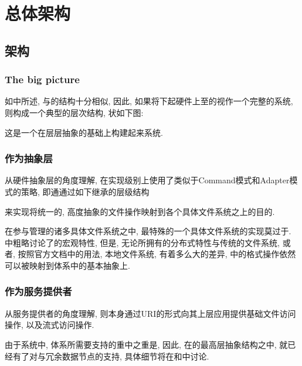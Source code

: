 \chapter{\HFS 总体架构}
\label{ch:hfs}

\section{\HFS 架构}
\label{sec:hfs:arch}

\subsection{The big picture}
\label{ssec:hfs:bigpic}

如中所述, {\HFS}与{\VFS}的结构十分相似,
因此, 如果将下起硬件上至{\HFS}的视作一个完整的系统, 则{\HFS}构成一个典型的层次结构,
状如下图:


这是一个在层层抽象的基础上构建起来系统.


\subsection{作为抽象层}
\label{ssec:hfs:al}

从硬件抽象层的角度理解{\HFS},
{\HFS}在实现级别上使用了类似于Command模式和Adapter模式的策略,
即通通过如下继承的层级结构


来实现将统一的, 高度抽象的文件操作映射到各个具体文件系统之上的目的.

在{\HFS}参与管理的诸多具体文件系统之中, 最特殊的一个具体文件系统的实现莫过于{\HDFS}.
中粗略讨论了{\HDFS}的宏观特性,
但是, 无论{\HDFS}所拥有的分布式特性与传统的文件系统, 或者, 按照官方文档中的用法, 本地文件系统,
有着多么大的差异, {\DHFS}中的格式操作依然可以被映射到{\HFS}体系中的基本抽象上.


\subsection{作为服务提供者}
\label{ssec:hfs:srv}

从服务提供者的角度理解{\HFS}, 则{\HFS}本身通过URI的形式向其上层应用提供基础文件访问操作,
以及流式访问操作.

由于{\Hadoop}系统中, {\HFS}体系所需要支持的重中之重是{\HDFS}, 因此,
在{\HFS}的最高层抽象结构之中, 就已经有了对与冗余数据节点的支持,
具体细节将在和中讨论.

